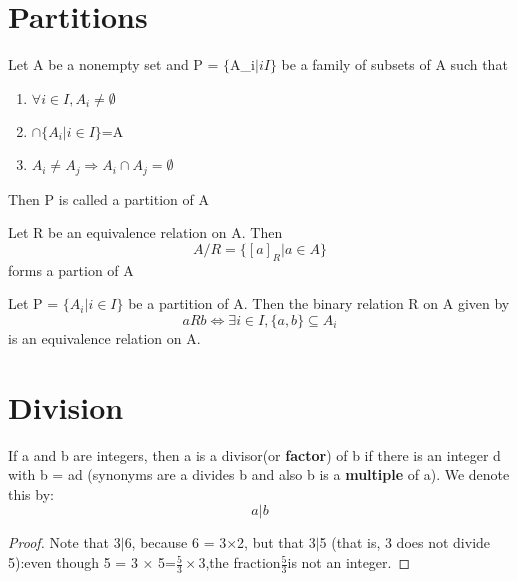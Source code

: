\documentclass[cn,10pt,math=newtx,citestyle=gb7714-2015,bibstyle=gb7714-2015]{elegantbook}
\begin{document}
\newpage
\section{Partitions}
\begin{definition}
    Let A be a nonempty set and P = $\{$A_i$ | i $\in$ I\}$ be a
family of subsets of A such that
\begin{enumerate}
    \item $\forall i \in I,A_i \neq \emptyset$
    \item $\cap \{A_i|i\in I\}$=A
    \item $A_i\neq A_j\Rightarrow A_i\cap A_j=\emptyset$
\end{enumerate}
 Then P is called a partition of A
\end{definition}

\begin{theorem}
    Let R be an equivalence relation on A. Then
    \begin{equation*}
        A/R=\{[a]_R|a\in A\}
    \end{equation*}
    forms a partion of A
\end{theorem}

\begin{theorem}
     Let P = $\{A_i | i \in I\}$ be a partition of A. Then the
binary relation R on A given by
\begin{equation*}
    a R b \Leftrightarrow \exists i \in I,\{a,b\}\subseteq A_i
\end{equation*}
is an equivalence relation on A.
\end{theorem}

\section{Division}

\begin{definition}
    If a and b are integers, then a is a divisor(or \textbf{factor}) of b if there is an integer d with b = ad (synonyms are a divides b and also b is a \textbf{multiple} of a). We denote this by:
    \begin{equation*}
        a|b
    \end{equation*}
\end{definition}
\begin{proof}
    Note that 3$|$6, because 6 = 3×2, but that 3$|$5 (that is, 3 does not divide 5):even though 5 = 3 × 5=$\frac{5}{3}\times 3$,the fraction$\frac{5}{3}$is not an integer.
\end{proof}
\end{document}
